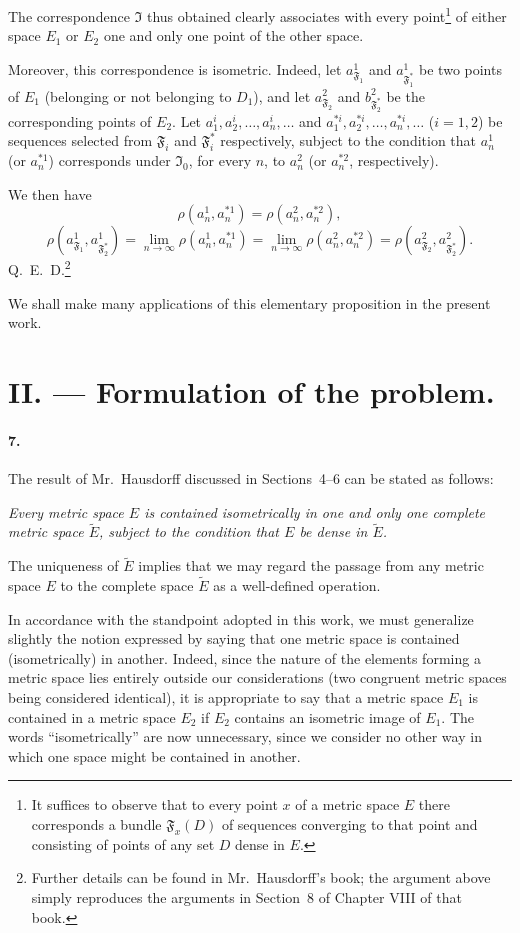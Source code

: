 \documentclass[a4paper,12pt]{amsart}
\newcommand{\fais}{\mathfrak{F}}
\newcommand{\iso}{\mathfrak{I}}
\newcommand{\srcpage}[1]{} %
\begin{document}
The correspondence $\iso$ thus obtained clearly associates with every point\footnote{It suffices to observe that to every point $x$ of a metric space $E$ there corresponds a bundle $\fais_x(D)$ of sequences converging to that point and consisting of points of any set $D$ dense in $E$.}
of either space $E_1$ or $E_2$ one and only one point of the other space.

Moreover, this correspondence is isometric. Indeed, let $a^1_{\fais_1}$ and $a^1_{\fais_1^*}$ be two points of $E_1$ (belonging or not belonging to $D_1$), and let $a^2_{\fais_2}$ and $b^2_{\fais_2^*}$ be the corresponding points of $E_2$. Let $a_1^i,a_2^i,\dots,a_n^i,\dots$ and $a_1^{*i},a_2^{*i},\dots,a_n^{*i},\dots$ ($i=1,2$) be sequences selected from $\fais_i$ and $\fais_i^*$ respectively, subject to the condition that $a_n^1$ (or $a_n^{*1}$) corresponds under $\iso_0$, for every $n$, to $a_n^2$ (or $a_n^{*2}$, respectively).

We then have
\[
\rho(a_n^1,a_n^{*1})=\rho(a_n^2,a_n^{*2}),
\]
\[
\rho(a^1_{\fais_1},a^1_{\fais_2^*})
=\lim_{n\to\infty}\rho(a_n^1,a_n^{*1})
=\lim_{n\to\infty}\rho(a_n^2,a_n^{*2})
=\rho(a^2_{\fais_2},a^2_{\fais_2^*}).
\]
\hfill \mbox{Q. E. D.}\footnote{Further details can be found in Mr.~Hausdorff's book; the argument above simply reproduces the arguments in Section~8 of Chapter VIII of that book.}

We shall make many applications of this elementary proposition in the present work.

\srcpage{50}
\section*{II. --- Formulation of the problem.}
\paragraph{7.}
The result of Mr.~Hausdorff discussed in Sections~4--6 can be stated as follows:

\textit{Every metric space $E$ is contained isometrically in one and only one complete metric space $\widetilde{E}$, subject to the condition that $E$ be dense in $\widetilde{E}$.}

The uniqueness of $\widetilde{E}$ implies that we may regard the passage from any metric space $E$ to the complete space $\widetilde{E}$ as a well-defined operation.

In accordance with the standpoint adopted in this work, we must generalize slightly the notion expressed by saying that one metric space is contained (isometrically) in another. Indeed, since the nature of the elements forming a metric space lies entirely outside our considerations (two congruent metric spaces being considered identical), it is appropriate to say that a metric space $E_1$ is contained in a metric space $E_2$ if $E_2$ contains an isometric image of $E_1$. The words ``isometrically'' are now unnecessary, since we consider no other way in which one space might be contained in another.
\end{document}
